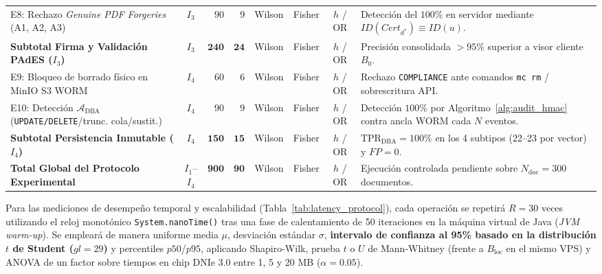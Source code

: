 \documentclass[runningheads,twocolumn]{llncs}
\begin{document}
\begin{table}[t]
\begin{tabularx}{\textwidth}{@{}>{\raggedright\arraybackslash}p{3.95cm}crrccc>{\raggedright\arraybackslash}X@{}}
E8: Rechazo \textit{Genuine PDF Forgeries} (A1, A2, A3) & $I_3$ & $90$ & $9$ & Wilson & Fisher & $h$ / OR & Detección del $100\%$ en servidor mediante $ID(Cert_{d^*}) \equiv ID(u)$. \\
\textbf{Subtotal Firma y Validación PAdES ($I_3$)} & $I_3$ & $\mathbf{240}$ & $\mathbf{24}$ & Wilson & Fisher & $h$ / OR & Precisión consolidada $> 95\%$ superior a visor cliente $B_0$. \\
\midrule
E9: Bloqueo de borrado físico en MinIO S3 WORM & $I_4$ & $60$ & $6$ & Wilson & Fisher & $h$ / OR & Rechazo \texttt{COMPLIANCE} ante comandos \texttt{mc rm} / sobrescritura API. \\
E10: Detección $\mathcal{A}_{\text{DBA}}$ (\texttt{UPDATE/DELETE}/trunc. cola/sustit.) & $I_4$ & $90$ & $9$ & Wilson & Fisher & $h$ / OR & Detección $100\%$ por Algoritmo~\ref{alg:audit_hmac} contra ancla WORM cada $N$ eventos. \\
\textbf{Subtotal Persistencia Inmutable ($I_4$)} & $I_4$ & $\mathbf{150}$ & $\mathbf{15}$ & Wilson & Fisher & $h$ / OR & $\text{TPR}_{\text{DBA}} = 100\%$ en los 4 subtipos (22--23 por vector) y $FP = 0$. \\
\midrule
\textbf{Total Global del Protocolo Experimental} & $I_1$--$I_4$ & $\mathbf{900}$ & $\mathbf{90}$ & Wilson & Fisher & $h$ / OR & Ejecución controlada pendiente sobre $N_{\text{doc}}=300$ documentos. \\
\bottomrule
\end{tabularx}
\end{table}

Para las mediciones de desempeño temporal y escalabilidad (Tabla~\ref{tab:latency_protocol}), cada operación se repetirá $R = 30$ veces utilizando el reloj monotónico \texttt{System.nanoTime()} tras una fase de calentamiento de 50 iteraciones en la máquina virtual de Java (\textit{JVM warm-up}). Se empleará de manera uniforme media $\mu$, desviación estándar $\sigma$, \textbf{intervalo de confianza al 95\% basado en la distribución $t$ de Student ($gl = 29$)} y percentiles $p50$/$p95$, aplicando Shapiro-Wilk, prueba $t$ o $U$ de Mann-Whitney (frente a $B_{\text{loc}}$ en el mismo VPS) y ANOVA de un factor sobre tiempos en chip DNIe 3.0 entre 1, 5 y 20 MB ($\alpha = 0.05$).
\end{document}
